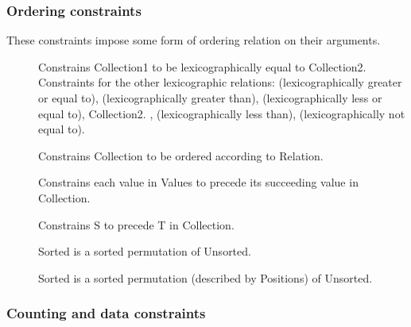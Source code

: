 \subsubsection{Ordering constraints}

These constraints impose some form of ordering relation on their arguments.

\begin{description}
\item[]
Constrains Collection1 to be lexicographically equal to Collection2. 
Constraints for the other lexicographic relations:
 (lexicographically greater or equal to),
 (lexicographically greater than),
(lexicographically less or equal to), Collection2.
,
(lexicographically less than),
(lexicographically not equal to).

\item[]
Constrains Collection to be ordered according to Relation.

\item[]
Constrains each value in Values to precede its succeeding
value in Collection.

\item[]
Constrains S to precede T in Collection.

\item[]
Sorted is a sorted permutation of Unsorted.

\item[]
Sorted is a sorted permutation (described by Positions) of Unsorted.

\end{description}

\subsubsection{Counting and data constraints}

